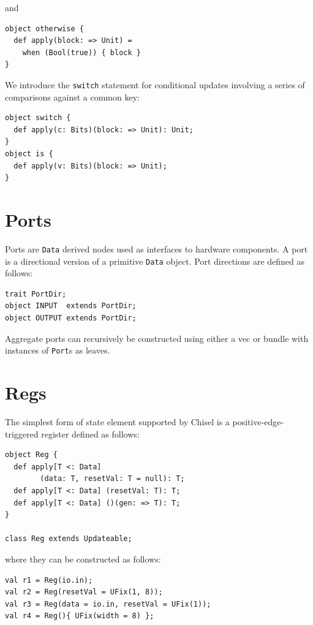 \documentclass[10pt,twocolumn]{article}
\def\code#1{{\small\tt #1}}
\begin{document}
\noindent 
and

\begin{lstlisting}
object otherwise {
  def apply(block: => Unit) = 
    when (Bool(true)) { block }
}
\end{lstlisting}

We introduce the \code{switch} statement for conditional updates
involving a series of comparisons against a common key:

\begin{lstlisting}
object switch {
  def apply(c: Bits)(block: => Unit): Unit;
}
object is {
  def apply(v: Bits)(block: => Unit);
}
\end{lstlisting}

\section{Ports}
\label{sec:ports}

Ports are \code{Data} derived nodes used as interfaces to hardware
components.   A port is a directional version of a primitive
\code{Data} object.  Port directions are defined as follows:

\begin{lstlisting}
trait PortDir;
object INPUT  extends PortDir;
object OUTPUT extends PortDir;
\end{lstlisting}

\noindent
Aggregate ports can recursively be constructed using either a vec or
bundle with instances of \code{Port}s as leaves.  

\section{Regs}

The simplest form of state element supported by Chisel is a
positive-edge-triggered register defined as follows:

\begin{lstlisting}
object Reg {
  def apply[T <: Data]
        (data: T, resetVal: T = null): T;
  def apply[T <: Data] (resetVal: T): T;
  def apply[T <: Data] ()(gen: => T): T;
}
 
class Reg extends Updateable;
\end{lstlisting}

\noindent
where they can be constructed as follows:

\begin{lstlisting}
val r1 = Reg(io.in);
val r2 = Reg(resetVal = UFix(1, 8));
val r3 = Reg(data = io.in, resetVal = UFix(1));
val r4 = Reg(){ UFix(width = 8) };
\end{lstlisting}
\end{document}

